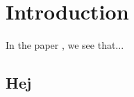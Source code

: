 \section{Introduction}
In the paper \cite[233]{Wang2016}, we see that...
\lipsum[1-3]

\subsection{Hej}

\lipsum[1-10]